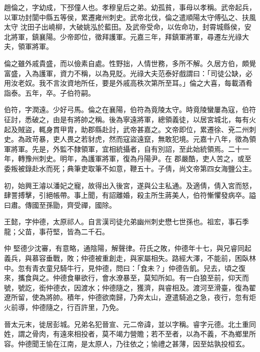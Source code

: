 
\begin{pinyinscope}

 趙倫之，字幼成，下邳僮人也。孝穆皇后之弟。幼孤貧，事母以孝稱。武帝起兵，以軍功封閬中縣五等侯，累遷雍州刺史。武帝北伐，倫之遣順陽太守傅弘之、扶風太守
 沈田子出嶢柳，大破姚泓於藍田。及武帝受命，以佐命功，封霄城縣侯，安北將軍，鎮襄陽。少帝即位，徵拜護軍。元嘉三年，拜鎮軍將軍，尋遷左光祿大夫，領軍將軍。



 倫之雖外戚貴盛，而以儉素自處。性野拙，人情世務，多所不解。久居方伯，頗覺富盛，入為護軍，資力不稱，以為見貶。光祿大夫范泰好戲謂曰：「司徒公缺，必用汝老奴。我不言汝資地所任，要是外戚高秩次第所至耳。」倫之大喜，每載酒肴詣泰。五年，卒。子伯符嗣。



 伯符，字潤遠。少好弓馬。倫之在襄陽，伯符為竟陵太守。時竟陵蠻屢為寇，伯符征討，悉破之，由是有將帥之稱。後為寧遠將軍，總領義徒，以居宮城北，每有火起及賊盜，輒身貫甲胄，助郡縣赴討，武帝甚嘉之。文帝即位，累遷徐、兗二州刺史。為政苛暴，吏人畏之若豺虎，然而寇盜遠竄，無敢犯境。元嘉十八年，徵為領軍將軍。先是，外監不隸領軍，宜相統攝者，自有別詔，至此始統領焉。二十一年，轉豫州刺史。明年，為護軍將軍，復為丹陽尹。在
 郡嚴酷，吏人苦之，或至委叛被錄赴水而死；典筆吏取筆不如意，鞭五十。子倩，尚文帝第四女海鹽公主。



 初，始興王濬以潘妃之寵，故得出入後宮，遂與公主私通。及適倩，倩入宮而怒，肆詈搏擊，引絕帳帶。事上聞，有詔離婚，殺主所生蔣美人，伯符慚懼發病卒。謚曰肅。傳國至孫勖，齊受禪，國除。



 王懿，字仲德，太原祁人。自言漢司徒允弟幽州刺史懋七世孫也。祖宏，事石季龍；父苗，事苻堅，皆為二千石。



 仲
 堅德少沈審，有意略，通陰陽，解聲律。苻氏之敗，仲德年十七，與兄睿同起義兵，與慕容垂戰，敗；仲德被重創走，與家屬相失。路經大澤，不能前，困臥林中。忽有青衣童兒騎牛行，見仲德，問曰：「食未？」仲德告飢。兒去，頃之復來，攜食與之。仲德食畢欲行，會水潦暴至，莫知所如。有一白狼至前，仰天而號，號訖，銜仲德衣，因渡水；仲德隨之，獲濟，與睿相及。渡河至滑臺，復為翟遼所留，使為將帥。積年，仲德欲南歸，乃奔太山，遼遣騎追之急，夜行，忽有炬
 火前導，仲德隨之，行百許里，乃免。



 晉太元末，徙居彭城。兄弟名犯晉宣、元二帝諱，並以字稱。睿字元德。北土重同姓，謂之骨肉，有遠來相投者，莫不竭力營贍；若不至者，以為不義，不為鄉里所容。仲德聞王愉在江南，是太原人，乃往依之；愉禮之甚薄，因至姑孰投桓玄。




\end{pinyinscope}
